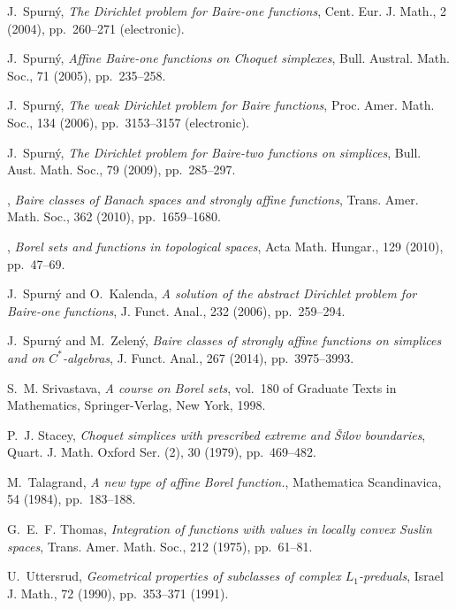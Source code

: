 \documentclass{amsart}
\numberwithin{equation}{section}
\theoremstyle{definition}
\begin{document}
\begin{thebibliography}{10}
{\sc J.~Spurn{\'y}}, {\em The {D}irichlet problem for {B}aire-one functions},
  Cent. Eur. J. Math., 2 (2004), pp.~260--271 (electronic).

{\sc J.~Spurn{\'y}}, {\em Affine {B}aire-one functions on {C}hoquet simplexes},
  Bull. Austral. Math. Soc., 71 (2005), pp.~235--258.

{\sc J.~Spurn{\'y}}, {\em The weak {D}irichlet problem for {B}aire functions},
  Proc. Amer. Math. Soc., 134 (2006), pp.~3153--3157 (electronic).

{\sc J.~Spurn{\'y}}, {\em The {D}irichlet problem for {B}aire-two functions on
  simplices}, Bull. Aust. Math. Soc., 79 (2009), pp.~285--297.

\leavevmode\vrule height 2pt depth -1.6pt width 23pt, {\em Baire classes of
  {B}anach spaces and strongly affine functions}, Trans. Amer. Math. Soc., 362
  (2010), pp.~1659--1680.

\leavevmode\vrule height 2pt depth -1.6pt width 23pt, {\em Borel sets and
  functions in topological spaces}, Acta Math. Hungar., 129 (2010), pp.~47--69.

{\sc J.~Spurn{\'y} and O.~Kalenda}, {\em A solution of the abstract {D}irichlet
  problem for {B}aire-one functions}, J. Funct. Anal., 232 (2006),
  pp.~259--294.

{\sc J.~Spurn{\'y} and M.~Zelen{\'y}}, {\em Baire classes of strongly affine
  functions on simplices and on {$C^*$}-algebras}, J. Funct. Anal., 267 (2014),
  pp.~3975--3993.

{\sc S.~M. Srivastava}, {\em A course on {B}orel sets}, vol.~180 of Graduate
  Texts in Mathematics, Springer-Verlag, New York, 1998.

{\sc P.~J. Stacey}, {\em Choquet simplices with prescribed extreme and \v
  {S}ilov boundaries}, Quart. J. Math. Oxford Ser. (2), 30 (1979),
  pp.~469--482.

{\sc M.~Talagrand}, {\em A new type of affine {B}orel function.}, Mathematica
  Scandinavica, 54 (1984), pp.~183--188.

{\sc G.~E.~F. Thomas}, {\em Integration of functions with values in locally
  convex {S}uslin spaces}, Trans. Amer. Math. Soc., 212 (1975), pp.~61--81.

{\sc U.~Uttersrud}, {\em Geometrical properties of subclasses of complex
  {$L_1$}-preduals}, Israel J. Math., 72 (1990), pp.~353--371 (1991).


\end{thebibliography}
\end{document}
